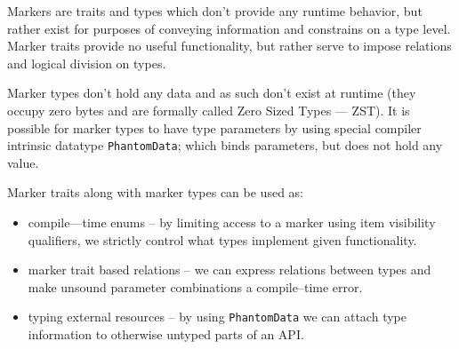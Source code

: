 Markers are traits and types which don't provide any runtime behavior, but rather exist for purposes of conveying information and constrains on a type level.
Marker traits provide no useful functionality, but rather serve to impose relations and logical division on types.

Marker types don't hold any data and as such don't exist at runtime (they occupy zero bytes and are formally called Zero Sized Types --- ZST).
It is possible for marker types to have type parameters by using special compiler intrinsic datatype \texttt{PhantomData}; which binds parameters, but does not hold any value.

Marker traits along with marker types can be used as:
\begin{itemize}
    \item compile---time enums -- by limiting access to a marker using item visibility qualifiers, we strictly control what types implement given functionality.
    \item marker trait based relations -- we can express relations between types and make unsound parameter combinations a compile--time error.
    \item typing external resources -- by using \texttt{PhantomData} we can attach type information to otherwise untyped parts of an API.
\end{itemize}

